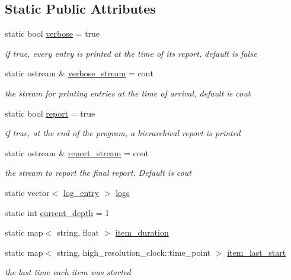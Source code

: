 \subsection*{Static Public Attributes}
\begin{DoxyCompactItemize}
\item 
static bool \hyperlink{classlogger_aab3c778c044ddf4b1b5fad8f4c230ff9}{verbose} = true
\begin{DoxyCompactList}\small\item\em if true, every entry is printed at the time of its report, default is false \end{DoxyCompactList}\item 
static ostream \& \hyperlink{classlogger_aec58cd6310ffb9939f8509daf1fcfbf8}{verbose\+\_\+stream} = cout
\begin{DoxyCompactList}\small\item\em the stream for printing entries at the time of arrival, default is cout \end{DoxyCompactList}\item 
static bool \hyperlink{classlogger_adbcc380b0ef53e23125f91e1c8f13f4e}{report} = true
\begin{DoxyCompactList}\small\item\em if true, at the end of the program, a hierarchical report is printed \end{DoxyCompactList}\item 
static ostream \& \hyperlink{classlogger_a8490b3400a43c9c6f3cc3cc122f10996}{report\+\_\+stream} = cout
\begin{DoxyCompactList}\small\item\em the stream to report the final report. Default is cout \end{DoxyCompactList}\item 
static vector$<$ \hyperlink{classlog__entry}{log\+\_\+entry} $>$ \hyperlink{classlogger_a46e89697a97bc41a90ec78763bfe4d39}{logs}
\item 
static int \hyperlink{classlogger_a9d29b49bd318a719a8e85b59eac54fe0}{current\+\_\+depth} = 1
\item 
static map$<$ string, float $>$ \hyperlink{classlogger_a8097637b66086185096030c96a1189ba}{item\+\_\+duration}
\item 
static map$<$ string, high\+\_\+resolution\+\_\+clock\+::time\+\_\+point $>$ \hyperlink{classlogger_af21bf7ca37e55cf225b282ab2f312c95}{item\+\_\+last\+\_\+start}
\begin{DoxyCompactList}\small\item\em the last time each item was started \end{DoxyCompactList}\end{DoxyCompactItemize}


